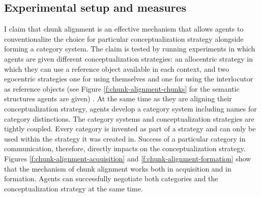 \subsection{Experimental setup and measures}
I claim that chunk alignment is an effective mechanism that allows agents to
conventionalize the choice for particular conceptualization strategy alongside 
forming a category system. The claim is tested by running experiments in which agents 
are given different conceptualization strategies: an allocentric strategy 
in which they can use a reference object available in each context, 
and two egocentric strategies one for using themselves and one for using the interlocutor as reference objects
(see Figure \ref{f:chunk-alignment-chunks} for the semantic structures agents are given) . 
At the same time as they are aligning their conceptualization strategy, agents develop a 
category system including names for category distinctions. The category systems and conceptualization
strategies are tightly coupled. Every category is invented as part of a strategy and can only be used
within the strategy it was created in. Success of a particular category in communication,
therefore, directly impacts on the conceptualization strategy. Figures \ref{f:chunk-alignment-acquisition}
and \ref{f:chunk-alignment-formation} show that the mechanism of chunk alignment works both in acquisition 
and in formation. Agents can successfully negotiate both categories and the 
conceptualization strategy at the same time.

